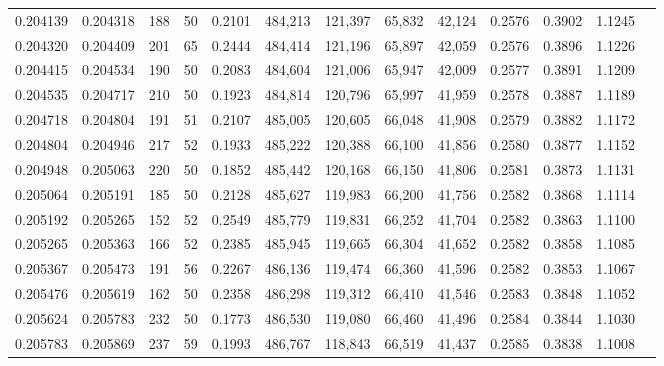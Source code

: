 \begin{tabular}{rrrrrrrrrrrrr}
0.204139 & 0.204318 &   188 &  50 &                                     0.2101 & 484,213 & 121,397 &  65,832 &  42,124 & 0.2576 & 0.3902 & 1.1245 \\
0.204320 & 0.204409 &   201 &  65 &                                     0.2444 & 484,414 & 121,196 &  65,897 &  42,059 & 0.2576 & 0.3896 & 1.1226 \\
0.204415 & 0.204534 &   190 &  50 &                                     0.2083 & 484,604 & 121,006 &  65,947 &  42,009 & 0.2577 & 0.3891 & 1.1209 \\
0.204535 & 0.204717 &   210 &  50 &                                     0.1923 & 484,814 & 120,796 &  65,997 &  41,959 & 0.2578 & 0.3887 & 1.1189 \\
0.204718 & 0.204804 &   191 &  51 &                                     0.2107 & 485,005 & 120,605 &  66,048 &  41,908 & 0.2579 & 0.3882 & 1.1172 \\
0.204804 & 0.204946 &   217 &  52 &                                     0.1933 & 485,222 & 120,388 &  66,100 &  41,856 & 0.2580 & 0.3877 & 1.1152 \\
0.204948 & 0.205063 &   220 &  50 &                                     0.1852 & 485,442 & 120,168 &  66,150 &  41,806 & 0.2581 & 0.3873 & 1.1131 \\
0.205064 & 0.205191 &   185 &  50 &                                     0.2128 & 485,627 & 119,983 &  66,200 &  41,756 & 0.2582 & 0.3868 & 1.1114 \\
0.205192 & 0.205265 &   152 &  52 &                                     0.2549 & 485,779 & 119,831 &  66,252 &  41,704 & 0.2582 & 0.3863 & 1.1100 \\
0.205265 & 0.205363 &   166 &  52 &                                     0.2385 & 485,945 & 119,665 &  66,304 &  41,652 & 0.2582 & 0.3858 & 1.1085 \\
0.205367 & 0.205473 &   191 &  56 &                                     0.2267 & 486,136 & 119,474 &  66,360 &  41,596 & 0.2582 & 0.3853 & 1.1067 \\
0.205476 & 0.205619 &   162 &  50 &                                     0.2358 & 486,298 & 119,312 &  66,410 &  41,546 & 0.2583 & 0.3848 & 1.1052 \\
0.205624 & 0.205783 &   232 &  50 &                                     0.1773 & 486,530 & 119,080 &  66,460 &  41,496 & 0.2584 & 0.3844 & 1.1030 \\
0.205783 & 0.205869 &   237 &  59 &                                     0.1993 & 486,767 & 118,843 &  66,519 &  41,437 & 0.2585 & 0.3838 & 1.1008 \\

\end{tabular}
